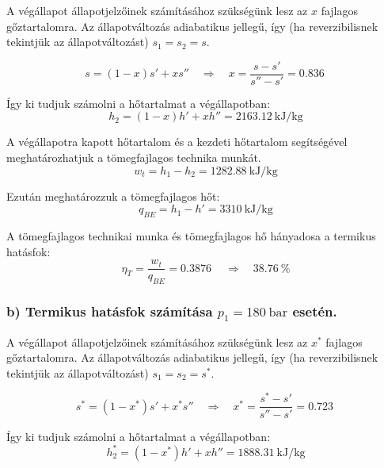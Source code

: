 A végállapot állapotjelzőinek számításához szükségünk lesz az $x$ fajlagos gőztartalomra. Az állapotváltozás adiabatikus jellegű, így (ha reverzibilisnek tekintjük az állapotváltozást) $s_1 = s_2 = s $.

\begin{equation}
	s = \left(1 - x\right) s' + x s''
	\quad 
	\Rightarrow
	\quad 
	x =	\dfrac{s - s'}{s'' - s'} = \SI{0,836}{}
\end{equation}


\noindent Így ki tudjuk számolni a hőtartalmat a végállapotban:
\begin{equation}
	h_2 = \left(1 - x\right) h' + x h'' = \SI{2163,12}{\kilo\joule\per\kilogram}
\end{equation}

\noindent A végállapotra kapott hőtartalom és a kezdeti hőtartalom segítségével meghatározhatjuk a tömegfajlagos technika munkát.
\begin{equation}
	w_t = h_1 - h_2 = \SI{1282,88}{\kilo\joule\per\kilogram}
\end{equation}

\noindent Ezután meghatározzuk a tömegfajlagos hőt:
\begin{equation}
	q_{BE} = h_1 - h' = \SI{3310}{\kilo\joule\per\kilogram}
\end{equation}

\pagebreak


\noindent A tömegfajlagos technikai munka és tömegfajlagos hő hányadosa a termikus hatásfok:
\begin{equation}
	\eta_{T} = \dfrac{w_t}{q_{BE}} = \SI{0,3876}{}
		\quad 
	\Rightarrow
	\quad 
	\SI{38,76}{\percent}
\end{equation}

\subsubsection*{b) Termikus hatásfok számítása $p_1=\SI{180}{\bar}$ esetén.}

A végállapot állapotjelzőinek számításához szükségünk lesz az $x^*$ fajlagos gőztartalomra. Az állapotváltozás adiabatikus jellegű, így (ha reverzibilisnek tekintjük az állapotváltozást) $s_1 = s_2 = s^* $.

\begin{equation}
s^* = \left(1 - x^*\right) s' + x^* s''
\quad 
\Rightarrow
\quad 
x^* =	\dfrac{s^* - s'}{s'' - s'} = \SI{0,723}{}
\end{equation}


\noindent Így ki tudjuk számolni a hőtartalmat a végállapotban:
\begin{equation}
h_2^* = \left(1 - x^*\right) h' + x h'' = \SI{1888,31}{\kilo\joule\per\kilogram}
\end{equation}

